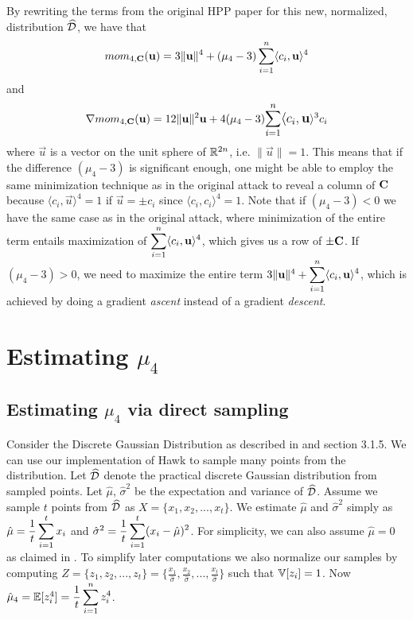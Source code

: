 By rewriting the terms from the original HPP paper \cite{NR09} for this new, normalized, distribution $\widehat{\mathcal{D}}$, we have that
\[mom_{4, \mathbf{C}} (\mathbf{u}) = 3 \lVert \mathbf{u} \rVert ^4 + (\mu_4 - 3) \sum_{i=1}^{n} \langle c_i, \mathbf{u} \rangle^4 \]
and
\[\nabla mom_{4, \mat{C}} (\vec{u}) = 12 \lVert \vec{u} \rVert^2 \vec{u} + 4(\mu_4 - 3) \mathlarger{\sum_{i=1}^{n} \langle c_i, \vec{u}} \rangle^3 c_i\]
where $\vec{u}$ is a vector on the unit sphere of $\mathbb{R}^{2n}$, i.e. $\lVert \vec{u} \rVert = 1$. 
This means that if the difference $(\mu_4 - 3)$ is significant enough, one might be able to employ the same minimization technique as in the original attack to reveal a column of $\mathbf{C}$ 
because $\langle c_i, \vec{u} \rangle^4 = 1$ if $\vec{u} = \pm c_i$ since $\langle c_i, c_i \rangle^4 = 1$.
Note that if $(\mu_4 - 3) < 0$ we have the same case as in the original attack, where minimization of the entire term entails maximization of $\mathlarger{\sum_{i=1}^{n} \langle c_i, \vec{u} \rangle^4}$, which gives us a row of $\pm \mathbf{C}$.
If $(\mu_4 - 3) > 0$, we need to maximize the entire term $3 \lVert \vec{u} \rVert ^4 + \mathlarger{\sum_{i=1}^{n} \langle c_i, \vec{u} \rangle^4}$, which is achieved by doing a gradient \textit{ascent} instead of a gradient \textit{descent}.

\section{Estimating $\mu_4$}


\subsection{Estimating $\mu_4$ via direct sampling}
Consider the Discrete Gaussian Distribution as described in \cite{HawkSpec24} and section 3.1.5. We can use our implementation of Hawk to sample many points from the distribution.
Let $\widehat{\mathcal{D}}$ denote the practical discrete Gaussian distribution from sampled points.
Let $\hat{\mu}$, $\hat{\sigma}^2$ be the expectation and variance of $\widehat{\mathcal{D}}$.
Assume we sample $t$ points from $\widehat{\mathcal{D}}$ as $X = \{x_1, x_2, ..., x_t\}$. We estimate $\hat{\mu}$ and $\hat{\sigma}^2$ simply as $\hat{\mu} = \mathlarger{\frac{1}{t} \sum_{i=1}^{t} x_i}$ and $\hat{\sigma}^2 = \mathlarger{\frac{1}{t} \sum_{i=1}^{t}(x_i - \hat{\mu})^2}$.
For simplicity, we can also assume $\hat{\mu} = 0$ as claimed in \cite{HawkSpec24}.
To simplify later computations we also normalize our samples by computing $Z = \{z_1, z_2, ..., z_t\} = \{\frac{x_1}{\hat{\sigma}}, \frac{x_2}{\hat{\sigma}},..., \frac{x_t}{\hat{\sigma}}\}$ such that 
$\mathbb{V}[z_i] = 1$.
Now $\hat{\mu}_4 = \bb{E}[z_i^4] = \mathlarger{\frac{1}{t} \sum_{i=1}^{n} z_i ^4}$. 

